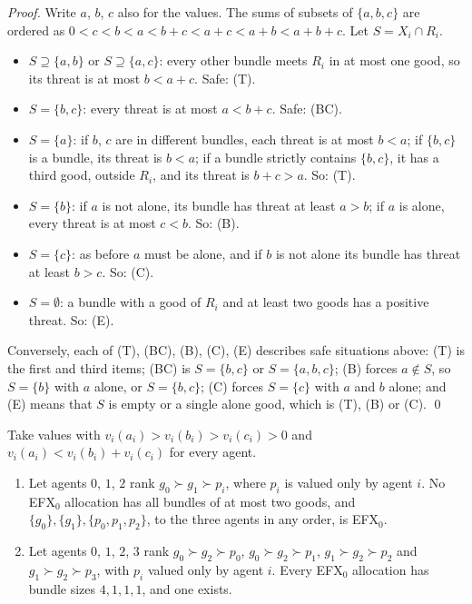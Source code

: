 \documentclass[runningheads,11pt]{llncs}
\newcommand{\efxz}{\texorpdfstring{\mbox{EFX$_0$}}{EFX0}}
\begin{document}
\begin{proof}
Write $a$, $b$, $c$ also for the values. The sums of subsets of $\{a,b,c\}$ are ordered as $0<c<b<a<b+c<a+c<a+b<a+b+c$. Let $S=X_i\cap R_i$.
\begin{itemize}
\item $S\supseteq\{a,b\}$ or $S\supseteq\{a,c\}$: every other bundle meets $R_i$ in at most one good, so its threat is at most $b<a+c$. Safe: (T).
\item $S=\{b,c\}$: every threat is at most $a<b+c$. Safe: (BC).
\item $S=\{a\}$: if $b$, $c$ are in different bundles, each threat is at most $b<a$; if $\{b,c\}$ is a bundle, its threat is $b<a$; if a bundle strictly contains $\{b,c\}$, it has a third good, outside $R_i$, and its threat is $b+c>a$. So: (T).
\item $S=\{b\}$: if $a$ is not alone, its bundle has threat at least $a>b$; if $a$ is alone, every threat is at most $c<b$. So: (B).
\item $S=\{c\}$: as before $a$ must be alone, and if $b$ is not alone its bundle has threat at least $b>c$. So: (C).
\item $S=\emptyset$: a bundle with a good of $R_i$ and at least two goods has a positive threat. So: (E).
\end{itemize}
Conversely, each of (T), (BC), (B), (C), (E) describes safe situations above: (T) is the first and third items; (BC) is $S=\{b,c\}$ or $S=\{a,b,c\}$; (B) forces $a\notin S$, so $S=\{b\}$ with $a$ alone, or $S=\{b,c\}$; (C) forces $S=\{c\}$ with $a$ and $b$ alone; and (E) means that $S$ is empty or a single alone good, which is (T), (B) or (C). \qed
\end{proof}

\begin{proposition}\label{prop:neg}
Take values with $v_i(a_i)>v_i(b_i)>v_i(c_i)>0$ and $v_i(a_i)<v_i(b_i)+v_i(c_i)$ for every agent.
\begin{enumerate}
\item[(a)] Let agents $0$, $1$, $2$ rank $g_0\succ g_1\succ p_i$, where $p_i$ is valued only by agent $i$. No \efxz{} allocation has all bundles of at most two goods, and $\{g_0\},\{g_1\},\{p_0,p_1,p_2\}$, to the three agents in any order, is \efxz{}.
\item[(b)] Let agents $0$, $1$, $2$, $3$ rank $g_0\succ g_2\succ p_0$, $g_0\succ g_2\succ p_1$, $g_1\succ g_2\succ p_2$ and $g_1\succ g_2\succ p_3$, with $p_i$ valued only by agent $i$. Every \efxz{} allocation has bundle sizes $4,1,1,1$, and one exists.
\end{enumerate}
\end{proposition}
\end{document}
